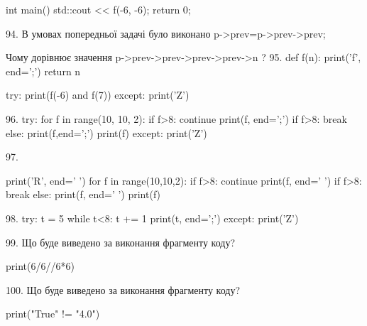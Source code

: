 \documentclass[11pt]{article}
\begin{document}
int main(){
    std::cout << f(-6, -6);
    return 0;
}

94. 
В умовах попередньої задачі було виконано p->prev=p->prev->prev;

Чому дорівнює значення p->prev->prev->prev->prev->n ?
95. 
def f(n):
    print('f', end=';')
    return n

try:
    print(f(-6) and f(7))
except:
    print('Z')

96. 
try:
    for f in range(10, 10, 2):
        if f>8:
            continue
        print(f, end=';')
        if f>8:
            break
    else:
        print(f,end=';')
    print(f)
except:
    print('Z')

97. 

print('R', end=' ')
for f in range(10,10,2):
    if f>8:
        continue
        print(f, end=' ')
    if f>8:
        break
    else:
        print(f, end=' ')
    print(f)

98. 
try:
    t = 5
    while t<8:
        t += 1
    print(t, end=';')
except:
    print('Z')

99. Що буде виведено за виконання фрагменту коду?

print(6/6//6*6)

100. Що буде виведено за виконання фрагменту коду?

print("True" != "4.0")





































































































\newpage
\end{document}
